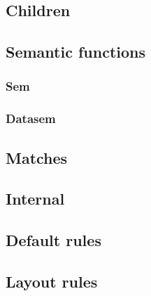 \subsection{Children}

\subsection{Semantic functions}

\subsubsection{Sem}

\subsubsection{Datasem}

\subsection{Matches}

\subsection{Internal}


\subsection{Default rules}

\subsection{Layout rules}
